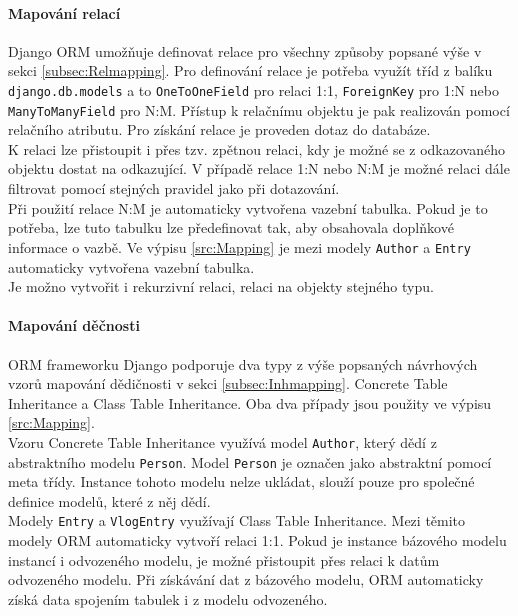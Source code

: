 \documentclass[ing,male,java,dept456]{diploma}						%
\begin{document}
\paragraph{Mapování relací} Django ORM umožňuje definovat relace pro všechny způsoby popsané výše v sekci \ref{subsec:Relmapping}. Pro definování relace je potřeba využít tříd z balíku \lstinline[style=custompython]|django.db.models| a to \lstinline[style=custompython]|OneToOneField| pro relaci 1:1, \lstinline[style=custompython]|ForeignKey| pro 1:N nebo \lstinline[style=custompython]|ManyToManyField| pro N:M. Přístup k relačnímu objektu je pak realizován pomocí relačního atributu. Pro získání relace je proveden dotaz do databáze. \\
K relaci lze přistoupit i přes tzv. zpětnou relaci, kdy je možné se z odkazovaného objektu dostat na odkazující. V případě relace 1:N nebo N:M je možné relaci dále filtrovat pomocí stejných pravidel jako při dotazování. \\
Při použití relace N:M je automaticky vytvořena vazební tabulka. Pokud je to potřeba, lze tuto tabulku lze předefinovat tak, aby obsahovala doplňkové informace o vazbě. Ve výpisu \ref{src:Mapping} je mezi modely \lstinline[style=inlinepython]|Author| a \lstinline[style=inlinepython]|Entry| automaticky vytvořena vazební tabulka. \\
Je možno vytvořit i rekurzivní relaci, relaci na objekty stejného typu. \\

\paragraph{Mapování děčnosti}

ORM frameworku Django podporuje dva typy z výše popsaných návrhových vzorů mapování dědičnosti v sekci \ref{subsec:Inhmapping}. Concrete Table Inheritance a Class Table Inheritance. Oba dva případy jsou použity ve výpisu \ref{src:Mapping}. \\
Vzoru Concrete Table Inheritance využívá model \lstinline[style=inlinepython]|Author|, který dědí z abstraktního modelu \lstinline[style=inlinepython]|Person|. Model \lstinline[style=inlinepython]|Person| je označen jako abstraktní pomocí meta třídy. Instance tohoto modelu nelze ukládat, slouží pouze pro společné definice modelů, které z něj dědí. \\
Modely \lstinline[style=inlinepython]|Entry| a \lstinline[style=inlinepython]|VlogEntry| využívají Class Table Inheritance. Mezi těmito modely ORM automaticky vytvoří relaci 1:1. Pokud je instance bázového modelu instancí i odvozeného modelu, je možné přistoupit přes relaci k datům odvozeného modelu. Při získávání dat z bázového modelu, ORM automaticky získá data spojením tabulek i z modelu odvozeného.
\end{document}
